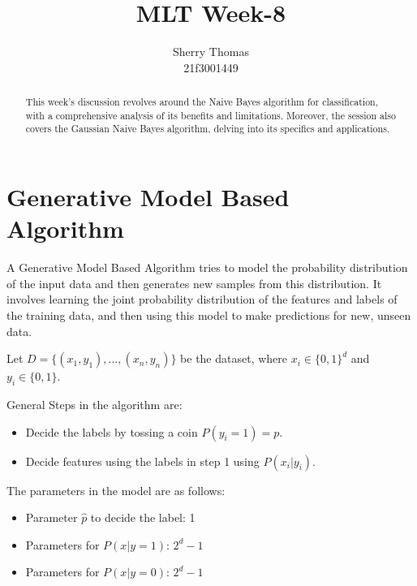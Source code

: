\documentclass[
]{article}
\author{}
\date{}
\providecommand{\tightlist}{%
  \setlength{\itemsep}{0pt}\setlength{\parskip}{0pt}}
\begin{document}
\title{MLT Week-8}
\author{Sherry Thomas \\ 21f3001449}

\maketitle
\tableofcontents

\begin{abstract}
This week's discussion revolves around the Naive Bayes algorithm for classification, with a comprehensive analysis of its benefits and limitations. Moreover, the session also covers the Gaussian Naive Bayes algorithm, delving into its specifics and applications.
\end{abstract}

\hypertarget{generative-model-based-algorithm}{%
\section{Generative Model Based
Algorithm}\label{generative-model-based-algorithm}}

A Generative Model Based Algorithm tries to model the probability
distribution of the input data and then generates new samples from this
distribution. It involves learning the joint probability distribution of
the features and labels of the training data, and then using this model
to make predictions for new, unseen data.

Let \(D=\{(x_1, y_1), \ldots, (x_n,y_n)\}\) be the dataset, where
\(x_i \in \{0, 1\}^d\) and \(y_i \in \{0, 1\}\).

\newpage
General Steps in the algorithm are:

\begin{itemize}
\tightlist
\item
  Decide the labels by tossing a coin \(P(y_i=1)=p\).
\item
  Decide features using the labels in step 1 using \(P(x_i|y_i)\).
\end{itemize}

The parameters in the model are as follows:

\begin{itemize}
\tightlist
\item
  Parameter \(\hat{p}\) to decide the label: 1
\item
  Parameters for \(P(x|y=1)\): \(2^d-1\)
\item
  Parameters for \(P(x|y=0)\): \(2^d-1\)
\end{itemize}
\end{document}
